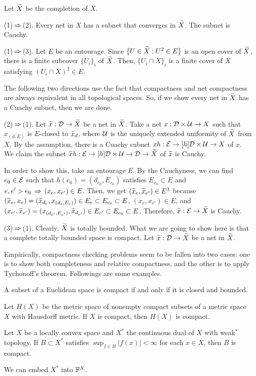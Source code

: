 \documentclass{../exp}
\begin{document}
\begin{pf}
Let $\widetilde X$ be the completion of $X$.

(1)$\,\Rightarrow\,$(2).
Every net in $X$ has a subnet that converges in $\widetilde X$.
The subnet is Cauchy.

(1)$\,\Rightarrow\,$(3).
Let $E$ be an entourage.
Since $\{U\in\widetilde X:U^2\in E\}$ is an open cover of $\widetilde X$, there is a finite subcover $\{U_i\}_i$ of $\widetilde X$.
Then, $\{U_i\cap X\}_i$ is a finite cover of $X$ satisfying $(U_i\cap X)^2\in E$.

The following two directions use the fact that compactness and net compactness are always equivalent in all topological spaces.
So, if we show every net in $\widetilde X$ has a Cuachy subnet, then we are done.

(2)$\,\Rightarrow\,$(1).
Let $\tld x:\cD\to\tld X$ be a net in $\widetilde X$.
Take a net $x:\cD\x\cU\to X$ such that $x_{(d,E)}$ is $E$-closed to $\widetilde x_d$, where $\mathcal{U}$ is the uniquely extended uniformity of $\widetilde X$ from $X$.
By the assumption, there is a Cuachy subnet $xh:\cE\to[h]\cD\x\cU\to X$ of $x$.
We claim the subnet $\tld xh:\cE\to[h]\cD\x\cU\to\cD\to\tld X$ of $\widetilde x$ is Cauchy.

In order to show this, take an entourage $E$.
By the Cauchyness, we can find $e_0\in\mathcal{E}$ such that $h(e_0)=(d_{e_0},E_{e_0})$ satisfies $E_{e_0}\subset E$ and $e,e'>e_0\,\Rightarrow\,(x_e,x_{e'})\in E$.
Then, we get $(\widetilde x_e,\widetilde x_{e'})\in E^3$ because $(\widetilde x_e,x_e)=(\widetilde x_{d_e},x_{(d_e,E_e)})\in E_e\subset E_{e_0}\subset E$, $(x_e,x_{e'})\in E$, and $(x_{e'},\widetilde x_{e'})=(x_{(d_{e'},E_{e'})},\widetilde x_{d_{e'}})\in E_{e'}\subset E_{e_0}\subset E$.
Therefore, $\tld x:\cE\to\tld X$ is Cauchy.

(3)$\,\Rightarrow\,$(1).
Clearly, $\widetilde X$ is totally bounded.
What we are going to show here is that a complete totally bounded space is compact.
Let $\tld x:\cD\to\tld X$ be a net in $\widetilde X$.


\end{pf}

Empirically, compactness checking problems seem to be fallen into two cases: one is to show both completeness and relative compactness, and the other is to apply Tychonoff's theorem.
Followings are some examples.

\begin{ex}
A subset of a Euclidean space is compact if and only if it is closed and bounded.
\end{ex}
\begin{ex}
Let $H(X)$ be the metric space of nonempty compact subsets of a metric space $X$ with Hausdorff metric.
If $X$ is compact, then $H(X)$ is compact.
\end{ex}
\begin{ex}
Let $X$ be a locally convex space and $X^*$ the continuous dual of $X$ with weak$^*$ topology.
If $B\subset X^*$ satisfies $\sup_{f\in B}|f(x)|<\infty$ for each $x\in X$, then $B$ is compact.
\end{ex}
\begin{pf}
We can embed $X^*$ into $\mathbb{F}^X$.
\end{pf}
\end{document}
